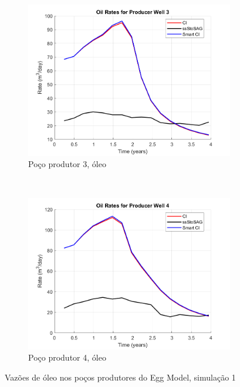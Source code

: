 \begin{figure}[!ht]
	\begin{subfigure}[b]{.45\textwidth}
		\includegraphics[width=\textwidth]{figs/resultadosEgg/imgsim1/EGG_OilWell3_Zoom}
		\caption{Po\c{c}o produtor 3, \'{o}leo}
		\label{EGG1_OilWell3}
	\end{subfigure}
	~
	\begin{subfigure}[b]{.45\textwidth}
		\includegraphics[width=\textwidth]{figs/resultadosEgg/imgsim1/EGG_OilWell4_Zoom}
		\caption{Po\c{c}o produtor 4, \'{o}leo}
		\label{EGG1_OilWell4}
	\end{subfigure}
\caption{Vaz\~{o}es de \'{o}leo nos po\c{c}os produtores do Egg Model, simula\c{c}\~{a}o 1}
\label{EGG1_OilRates}
\end{figure}

